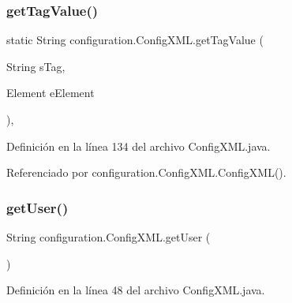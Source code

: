 \subsubsection{\texorpdfstring{getTagValue()}{getTagValue()}}
{\footnotesize\ttfamily static String configuration.\+Config\+X\+M\+L.\+get\+Tag\+Value (\begin{DoxyParamCaption}\item[{String}]{s\+Tag,  }\item[{Element}]{e\+Element }\end{DoxyParamCaption})\hspace{0.3cm}{\ttfamily [static]}, {\ttfamily [private]}}



Definición en la línea 134 del archivo Config\+X\+M\+L.\+java.


\begin{DoxyCode}{0}

\end{DoxyCode}


Referenciado por configuration.\+Config\+X\+M\+L.\+Config\+X\+M\+L().

\mbox{\label{classconfiguration_1_1_config_x_m_l_a98e53bd841ca5f520af914f96ff2afef}} 
\subsubsection{\texorpdfstring{getUser()}{getUser()}}
{\footnotesize\ttfamily String configuration.\+Config\+X\+M\+L.\+get\+User (\begin{DoxyParamCaption}{ }\end{DoxyParamCaption})}



Definición en la línea 48 del archivo Config\+X\+M\+L.\+java.


\begin{DoxyCode}{0}

\end{DoxyCode}



